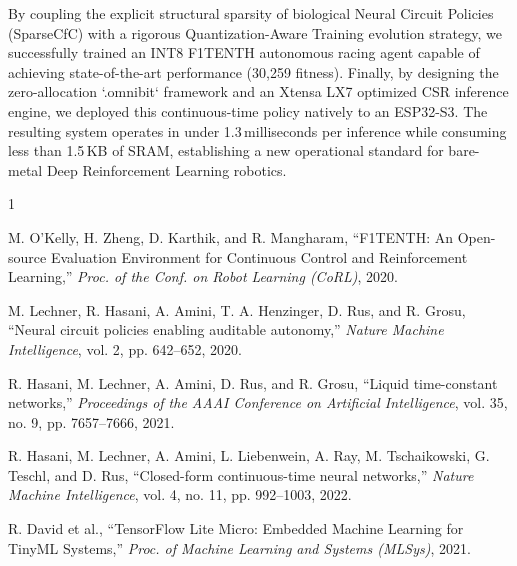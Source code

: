 \documentclass[lettersize,journal]{IEEEtran}
\begin{document}
By coupling the explicit structural sparsity of biological Neural Circuit Policies (SparseCfC) with a rigorous Quantization-Aware Training evolution strategy, we successfully trained an INT8 F1TENTH autonomous racing agent capable of achieving state-of-the-art performance (30,259 fitness). Finally, by designing the zero-allocation `.omnibit` framework and an Xtensa LX7 optimized CSR inference engine, we deployed this continuous-time policy natively to an ESP32-S3. The resulting system operates in under 1.3\,milliseconds per inference while consuming less than 1.5\,KB of SRAM, establishing a new operational standard for bare-metal Deep Reinforcement Learning robotics.

\begin{thebibliography}{1}


M. O'Kelly, H. Zheng, D. Karthik, and R. Mangharam, ``F1TENTH: An Open-source Evaluation Environment for Continuous Control and Reinforcement Learning,'' \textit{Proc. of the Conf. on Robot Learning (CoRL)}, 2020.

M. Lechner, R. Hasani, A. Amini, T. A. Henzinger, D. Rus, and R. Grosu, ``Neural circuit policies enabling auditable autonomy,'' \textit{Nature Machine Intelligence}, vol. 2, pp. 642--652, 2020.

R. Hasani, M. Lechner, A. Amini, D. Rus, and R. Grosu, ``Liquid time-constant networks,'' \textit{Proceedings of the AAAI Conference on Artificial Intelligence}, vol. 35, no. 9, pp. 7657--7666, 2021.

R. Hasani, M. Lechner, A. Amini, L. Liebenwein, A. Ray, M. Tschaikowski, G. Teschl, and D. Rus, ``Closed-form continuous-time neural networks,'' \textit{Nature Machine Intelligence}, vol. 4, no. 11, pp. 992--1003, 2022.

R. David et al., ``TensorFlow Lite Micro: Embedded Machine Learning for TinyML Systems,'' \textit{Proc. of Machine Learning and Systems (MLSys)}, 2021.

\end{thebibliography}

\vfill
\end{document}
